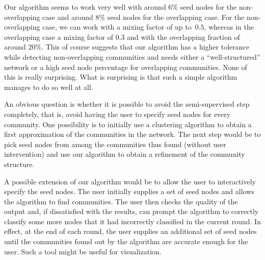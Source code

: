 Our algorithm seems to work very well with around 6$\%$ seed nodes for the 
non-overlapping case and around 8$\%$ seed nodes for the overlapping case. 
For the non-overlapping case, we can work with a mixing factor of up 
to~$0.5$, whereas in the overlapping case a mixing factor of $0.3$ 
and with the overlapping fraction of around $20\%$. This of course 
suggests that our algorithm has a higher tolerance while detecting 
non-overlapping communities and needs either a ``well-structured''
network or a high seed node percentage for overlapping communities. 
None of this is really surprising. What is surprising is that such 
a simple algorithm manages to do so well at all.

An obvious question is whether it is possible to avoid the semi-supervised 
step completely, that is, avoid having the user to specify seed nodes 
for every community. One possibility is to initially use a clustering 
algorithm to obtain a first approximation of the communities in the network. 
The next step would be to pick seed nodes from among the communities thus found 
(without user intervention) and use our algorithm to obtain a refinement of the 
community structure. 


A possible extension of our algorithm would be to allow the user to interactively 
specify the seed nodes. The user initially supplies a set of seed nodes 
and allows the algorithm to find communities. The user then checks the 
quality of the output and, if dissatisfied with the results, can prompt the algorithm 
to correctly classify some more nodes that it had incorrectly classified in the current round. 
In effect, at the end of each round, the user supplies an additional set of seed nodes until the 
communities found out by the algorithm are accurate enough for the user. Such a tool 
might be useful for visualization.





